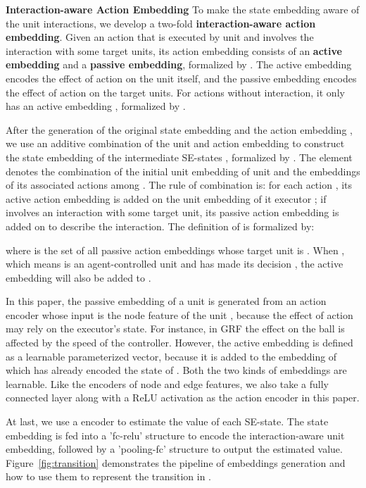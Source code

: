 \documentclass[letterpaper]{article} \usepackage{aaai23}  \usepackage{times}  \usepackage{helvet}  \usepackage{courier}  \usepackage[hyphens]{url}  \usepackage{graphicx} \urlstyle{rm} \def\UrlFont{\rm}  \usepackage{natbib}  \usepackage{caption} \frenchspacing  \setlength{\pdfpagewidth}{8.5in} \setlength{\pdfpageheight}{11in} \usepackage{algorithm}
\begin{document}
\textbf{Interaction-aware Action Embedding} 
To make the state embedding  aware of the unit interactions, we develop a two-fold \textbf{interaction-aware action embedding}. Given an action  that is executed by unit  and involves the interaction with some target units, its action embedding consists of an \textbf{active embedding} and a \textbf{passive embedding}, formalized by . The active embedding  encodes the effect of action  on the unit  itself, and the passive embedding  encodes the effect of action  on the target units. For actions without interaction, it only has an active embedding , formalized by .

After the generation of the original state embedding  and the action embedding , we use an additive combination of the unit and action embedding to construct the state embedding  of the intermediate SE-states , formalized by . The element  denotes the combination of the initial unit embedding  of unit  and the embeddings of its associated actions among . The rule of combination is: for each action , its active action embedding  is added on the unit embedding  of it executor ; if  involves an interaction with some target unit, 
its passive action embedding  is added on  to describe the interaction. The definition of  is formalized by:

\vspace{-3mm}
\begin{small}

\end{small}
where  is the set of all passive action embeddings whose target unit is . When , which means  is an agent-controlled unit and has made its decision , the active embedding  will also be added to . 

In this paper, the passive embedding  of a unit  is generated from an action encoder whose input is the node feature of the unit , because the effect of action  may rely on the executor's state. For instance, in GRF the effect on the ball is affected by the speed of the controller. However, the active embedding  is defined as a learnable parameterized vector, because it is added to the embedding  of  which has already encoded the state of . Both the two kinds of embeddings are learnable. Like the encoders of node and edge features, we also take a fully connected layer along with a ReLU activation as the action encoder in this paper. 

At last, we use a encoder to estimate the value of each SE-state. 
The state embedding  is fed into a 'fc-relu' structure to encode the interaction-aware unit embedding, 
followed by a 'pooling-fc' structure to output the estimated value. 
Figure~\ref{fig:transition} demonstrates the pipeline of embeddings generation and how to use them to represent the transition in .
\end{document}
